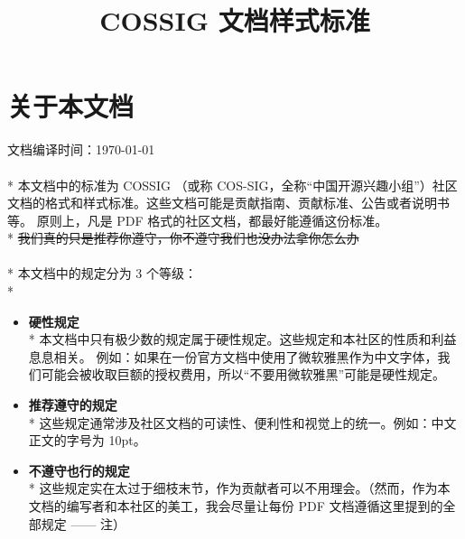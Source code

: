 





    \title{\textbf{COSSIG 文档样式标准}}
    \author{}  %
    \date{}  %

    \maketitle

    \section{关于本文档}

    文档编译时间：\today
    \\
    \\*
    本文档中的标准为 COSSIG （或称 COS-SIG，全称“中国开源兴趣小组”）社区文档的格式和样式标准。这些文档可能是贡献指南、贡献标准、公告或者说明书等。
    原则上，凡是 PDF 格式的社区文档，都最好能遵循这份标准。\\*
    {\color{Grey0} \sout{我们真的只是推荐你遵守，你不遵守我们也没办法拿你怎么办}}
    \\
    \\*
    本文档中的规定分为 3 个等级：\\*
    \begin{itemize}
        \item \textbf{\large{硬性规定}}\\*
        本文档中只有极少数的规定属于硬性规定。这些规定和本社区的性质和利益息息相关。
        例如：如果在一份官方文档中使用了微软雅黑作为中文字体，我们可能会被收取巨额的授权费用，所以“不要用微软雅黑”可能是硬性规定。
        \\
        \item \textbf{\large{推荐遵守的规定}}\\*
        这些规定通常涉及社区文档的可读性、便利性和视觉上的统一。例如：中文正文的字号为 10pt。
        \\
        \item \textbf{\large{不遵守也行的规定}}\\*
        这些规定实在太过于细枝末节，作为贡献者可以不用理会。（然而，作为本文档的编写者和本社区的美工，我会尽量让每份 PDF 文档遵循这里提到的全部规定 —— 注）
        \\
    \end{itemize}

